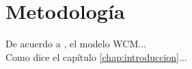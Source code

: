 \chapter{Metodología}
\label{chap:metodologia}

 De acuerdo a \cite{Barrett2009}, el modelo WCM...\\

 
 
  Como dice el capítulo \ref{chap:introduccion}...

% 
% 
